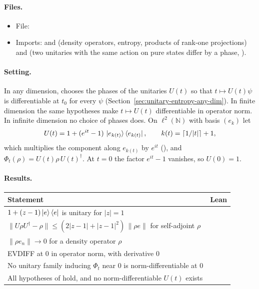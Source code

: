 \documentclass[11pt]{article}
\begin{document}
\paragraph{Files.}\leavevmode
\begin{itemize}
\item File: 
\item Imports:  and
   (density operators, entropy, products of rank-one
  projections) and  (two unitaries with the
  same action on pure states differ by a phase, ).
\end{itemize}

\paragraph{Setting.} In any dimension,  chooses
the phases of the unitaries $U(t)$ so that $t \mapsto U(t)\psi$ is differentiable at $t_0$ for
every $\psi$ (Section~\ref{sec:unitary-entropy-any-dim}). In finite dimension the same
hypotheses make $t \mapsto U(t)$ differentiable in operator norm. In infinite dimension no choice
of phases does. On $\ell^2(\mathbb{N})$ with basis $(e_k)$ let
\[ U(t) = 1 + (e^{it} - 1)\,\ket{e_{k(t)}}\bra{e_{k(t)}}, \qquad
  k(t) = \lceil 1/|t| \rceil + 1, \]
which multiplies the component along $e_{k(t)}$ by $e^{it}$ (), and
$\Phi_t(\rho) = U(t)\rho\,U(t)^\dagger$. At $t = 0$ the factor $e^{it} - 1$ vanishes, so
$U(0) = 1$.

\paragraph{Results.}
\begin{center}
\begin{tabularx}{\textwidth}{@{}BL@{}}
\toprule
Statement & Lean \\
\midrule
$1 + (z-1)\ket{e}\bra{e}$ is unitary for $|z| = 1$ &  \\
$\|U\rho U^\dagger - \rho\| \le (2|z-1| + |z-1|^2)\,\|\rho e\|$ for self-adjoint $\rho$ &
   \\
$\|\rho e_n\| \to 0$ for a density operator $\rho$ &  \\
EVDIFF at $0$ in operator norm, with derivative $0$ &  \\
No unitary family inducing $\Phi_t$ near $0$ is norm-differentiable at $0$ &
   \\
All hypotheses of  hold, and no
  norm-differentiable $U(t)$ exists &  \\
\bottomrule
\end{tabularx}
\end{center}
\end{document}
